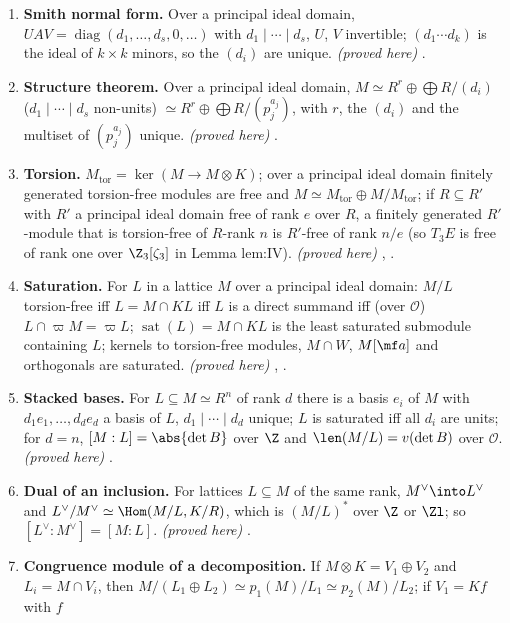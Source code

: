 \begin{enumerate}[label=\textbf{\thechapter.\arabic*}]
\emph{(proved here)} .
\item \textbf{Smith normal form.} Over a principal ideal domain, $UAV=\operatorname{diag}(d_1,\dots,d_s,0,\dots)$ with $d_1\mid\cdots\mid d_s$, $U$, $V$ invertible; $(d_1\cdots d_k)$ is the ideal of
$k\times k$ minors, so the $(d_i)$ are unique. \emph{(proved here)} .
\item \textbf{Structure theorem.} Over a principal ideal domain, $M\simeq R^r\oplus\bigoplus R/(d_i)$ ($d_1\mid\cdots\mid d_s$ non-units) $\simeq R^r\oplus\bigoplus R/(p_j^{a_j})$, with $r$, the $(d_i)$ and the
multiset of $(p_j^{a_j})$ unique. \emph{(proved here)} .
\item \textbf{Torsion.} $M_{\mathrm{tor}}=\ker(M\to M\otimes K)$; over a principal ideal domain finitely generated torsion-free modules are free and $M\simeq M_{\mathrm{tor}}\oplus M/M_{\mathrm{tor}}$; if
$R\subseteq R'$ with $R'$ a principal ideal domain free of rank $e$ over $R$, a finitely generated $R'$-module that is torsion-free of $R$-rank $n$ is $R'$-free of rank $n/e$
(so $T_3E$ is free of rank one over $\Z_3[\zeta_3]$ in Lemma lem:IV). \emph{(proved here)} , .
\item \textbf{Saturation.} For $L$ in a lattice $M$ over a principal ideal domain: $M/L$ torsion-free iff $L=M\cap KL$ iff $L$ is a direct summand iff (over $\mathcal O$)
$L\cap\varpi M=\varpi L$; $\operatorname{sat}(L)=M\cap KL$ is the least saturated submodule containing $L$; kernels to torsion-free modules, $M\cap W$, $M[\mf a]$ and orthogonals are
saturated. \emph{(proved here)} , .
\item \textbf{Stacked bases.} For $L\subseteq M\simeq R^n$ of rank $d$ there is a basis $e_i$ of $M$ with $d_1e_1,\dots,d_de_d$ a basis of $L$, $d_1\mid\cdots\mid d_d$ unique; $L$ is saturated iff
all $d_i$ are units; for $d=n$, $[M:L]=\abs{\det B}$ over $\Z$ and $\len(M/L)=v(\det B)$ over $\mathcal O$. \emph{(proved here)} .
\item \textbf{Dual of an inclusion.} For lattices $L\subseteq M$ of the same rank, $M^\vee\into L^\vee$ and $L^\vee/M^\vee\simeq\Hom(M/L,K/R)$, which is $(M/L)^*$ over $\Z$ or $\Zl$; so
$[L^\vee:M^\vee]=[M:L]$. \emph{(proved here)} .
\item \textbf{Congruence module of a decomposition.} If $M\otimes K=V_1\oplus V_2$ and $L_i=M\cap V_i$, then $M/(L_1\oplus L_2)\simeq p_1(M)/L_1\simeq p_2(M)/L_2$; if $V_1=Kf$ with $f$

\end{enumerate}
